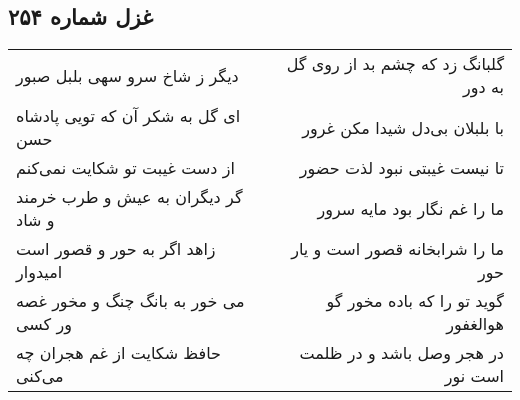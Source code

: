 \begin{center}
\section*{غزل شماره ۲۵۴}
\label{sec:sh254}
\begin{longtable}{l p{0.5cm} r}
دیگر ز شاخ سرو سهی بلبل صبور
&&
گلبانگ زد که چشم بد از روی گل به دور
\\
ای گل به شکر آن که تویی پادشاه حسن
&&
با بلبلان بی‌دل شیدا مکن غرور
\\
از دست غیبت تو شکایت نمی‌کنم
&&
تا نیست غیبتی نبود لذت حضور
\\
گر دیگران به عیش و طرب خرمند و شاد
&&
ما را غم نگار بود مایه سرور
\\
زاهد اگر به حور و قصور است امیدوار
&&
ما را شرابخانه قصور است و یار حور
\\
می خور به بانگ چنگ و مخور غصه ور کسی
&&
گوید تو را که باده مخور گو هوالغفور
\\
حافظ شکایت از غم هجران چه می‌کنی
&&
در هجر وصل باشد و در ظلمت است نور
\\
\end{longtable}
\end{center}
